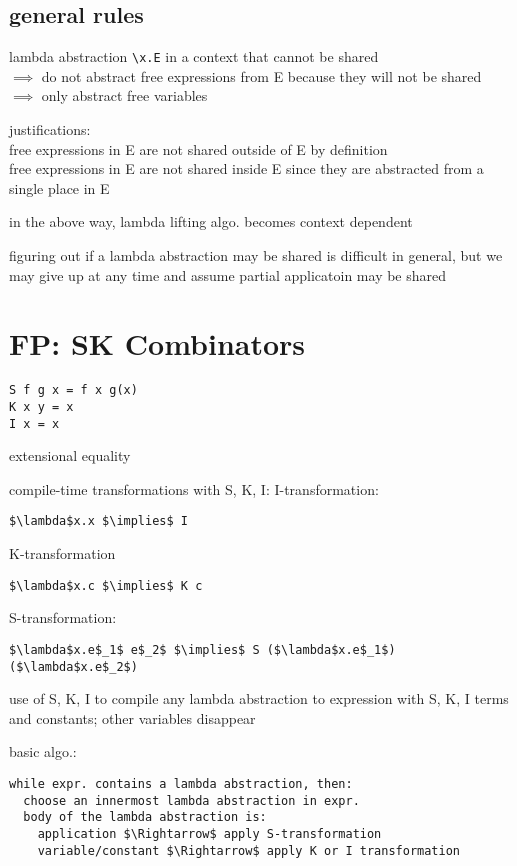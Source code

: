 \documentclass[8pt]{extarticle}
\begin{document}
\begin{multicols*}{2}
\subsection{general rules}
lambda abstraction \verb|\x.E| in a context that cannot be shared\\
$\implies$ do not abstract free expressions from E because they will not be shared\\
$\implies$ only abstract free variables

justifications:\\
free expressions in E are not shared outside of E by definition\\
free expressions in E are not shared inside E since they are abstracted from a single place in E

in the above way, lambda lifting algo. becomes context dependent

figuring out if a lambda abstraction may be shared is difficult in general, but we may give up at any time and assume partial applicatoin may be shared

\vfill\null
\columnbreak

\section{FP: SK Combinators}

\begin{lstlisting}
S f g x = f x g(x)
K x y = x
I x = x
\end{lstlisting}

extensional equality

compile-time transformations with S, K, I:
I-transformation:
\begin{lstlisting}
$\lambda$x.x $\implies$ I
\end{lstlisting}

K-transformation
\begin{lstlisting}
$\lambda$x.c $\implies$ K c
\end{lstlisting}

S-transformation:
\begin{lstlisting}
$\lambda$x.e$_1$ e$_2$ $\implies$ S ($\lambda$x.e$_1$)($\lambda$x.e$_2$)
\end{lstlisting}

use of S, K, I to compile any lambda abstraction to expression with S, K, I terms and constants; other variables disappear

basic algo.:
\begin{lstlisting}
while expr. contains a lambda abstraction, then:
  choose an innermost lambda abstraction in expr.
  body of the lambda abstraction is:
    application $\Rightarrow$ apply S-transformation
    variable/constant $\Rightarrow$ apply K or I transformation
\end{lstlisting}


\end{multicols*}
\end{document}
